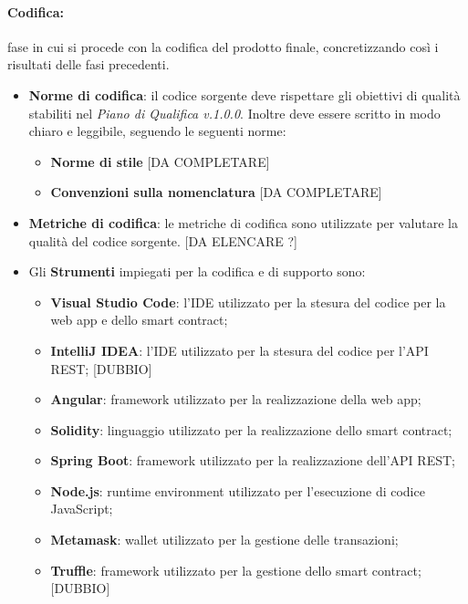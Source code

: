 \paragraph{Codifica:} fase in cui si procede con la codifica del prodotto finale, concretizzando così i risultati delle fasi precedenti.
\begin{itemize}
    \item \textbf{Norme di codifica}: il codice sorgente deve rispettare gli obiettivi di qualità stabiliti nel \textit{Piano di Qualifica v.1.0.0}. \newline
    Inoltre deve essere scritto in modo chiaro e leggibile, seguendo le seguenti norme:
    \begin{itemize}
        \item \textbf{Norme di stile} [DA COMPLETARE]
        \item \textbf{Convenzioni sulla nomenclatura} [DA COMPLETARE]
    \end{itemize}
    \item \textbf{Metriche di codifica}: le metriche di codifica sono utilizzate per valutare la qualità del codice sorgente. [DA ELENCARE ?]
    \item Gli \textbf{Strumenti} impiegati per la codifica e di supporto sono:
    \begin{itemize}
        \item \textbf{Visual Studio Code}: l'IDE utilizzato per la stesura del codice per la web app e dello smart contract;
        \item \textbf{IntelliJ IDEA}: l'IDE utilizzato per la stesura del codice per l'API REST; [DUBBIO]
        \item \textbf{Angular}: framework utilizzato per la realizzazione della web app;
        \item \textbf{Solidity}: linguaggio utilizzato per la realizzazione dello smart contract;
        \item \textbf{Spring Boot}: framework utilizzato per la realizzazione dell'API REST;
        \item \textbf{Node.js}: runtime environment utilizzato per l'esecuzione di codice JavaScript;
        \item \textbf{Metamask}: wallet utilizzato per la gestione delle transazioni;
        \item \textbf{Truffle}: framework utilizzato per la gestione dello smart contract; [DUBBIO]
    \end{itemize}
\end{itemize}

